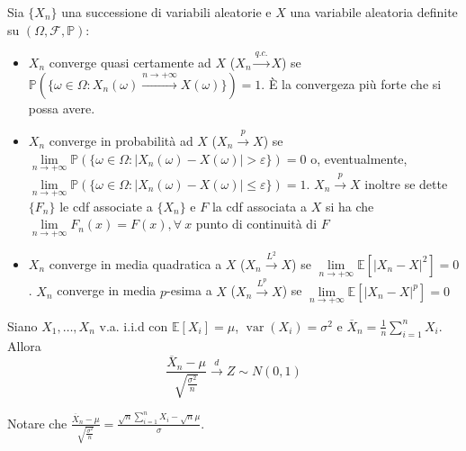 \documentclass[hidelinks, 10pt]{report}
\DeclareMathOperator{\var}{var}
\begin{document}
\begin{defn}
Sia $  \{ X_n \} $ una successione di variabili aleatorie e $ X $ una variabile aleatoria definite su $ (\Omega, \mathcal{F}, \mathbb{P}) $:

\begin{itemize}
\item $ X_n $ converge quasi certamente ad $ X $ ($ X_n \stackrel{q.c.}{\to} X $) se $ \mathbb{P} (\{ \omega \in \Omega : X_n (\omega) \stackrel{n \to +\infty}{\to} X (\omega) \}) = 1 $. \`E la convergeza pi\`u forte che si possa avere.
\item $ X_n $ converge in probabilit\`a ad $ X $ ($ X_n \stackrel{p}{\to} X $) se $ \lim\limits_{n \to +\infty} \mathbb{P} (\{ \omega \in \Omega : \vert X_n (\omega) - X (\omega) \vert > \varepsilon \}) = 0 $ o, eventualmente, $ \lim\limits_{n \to +\infty} \mathbb{P} (\{ \omega \in \Omega : \vert X_n (\omega) - X (\omega) \vert \le \varepsilon \}) = 1 $. $ X_n \stackrel{p}{\to} X $ inoltre se dette $ \{ F_{n} \} $ le cdf associate a $ \{ X_n \} $ e $ F $ la cdf associata a $ X $ si ha che $ \lim\limits_{n \to +\infty} F_n (x) = F(x), \forall\ x $ punto di continuit\`a di $ F $
\item $ X_n $ converge in media quadratica a $ X $ ($ X_n \stackrel{L^{2}}{\to} X $) se $ \lim\limits_{n \to +\infty} \mathbb{E} [\vert X_n - X \vert^{2}] = 0 $. $ X_n $ converge in media $ p $-esima a $ X $ ($ X_n \stackrel{L^{p}}{\to} X $) se $ \lim\limits_{n \to +\infty} \mathbb{E} [\vert X_n - X \vert^{p}] = 0 $
\end{itemize}
\end{defn}

\begin{thm}
\begin{figure}[H]	%
\end{figure}
\end{thm}

\begin{es}[TLC]
Siano $ X_1, \dotsc, X_n $ v.a. i.i.d con $ \mathbb{E} [X_i] = \mu $, $ \var(X_i) = \sigma^2 $ e $ \overline{X}_n = \frac{1}{n} \sum\limits_{i = 1}^{n} X_i $. Allora
\[ \frac{\overline{X}_n - \mu}{\sqrt{\frac{\sigma^2}{n}}} \stackrel{d}{\to} Z \sim N(0, 1) \]

Notare che $ \frac{\overline{X}_n - \mu}{\sqrt{\frac{\sigma^2}{n}}} = \frac{\sqrt{n} \sum\limits_{i = 1}^{n} X_i - \sqrt{n} \mu}{\sigma} $.
\end{es}
\end{document}
